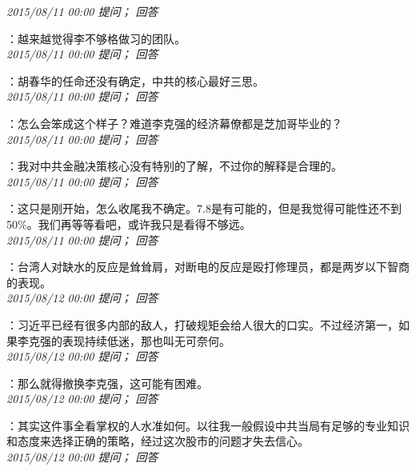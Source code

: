 \documentclass[twocolumn]{ctexart}
\begin{document}
\textit{\hfill\noindent\small 2015/08/11 00:00 提问； 回答}

：越来越觉得李不够格做习的团队。\\

\textit{\hfill\noindent\small 2015/08/11 00:00 提问； 回答}

：胡春华的任命还没有确定，中共的核心最好三思。\\

\textit{\hfill\noindent\small 2015/08/11 00:00 提问； 回答}

：怎么会笨成这个样子？难道李克强的经济幕僚都是芝加哥毕业的？\\

\textit{\hfill\noindent\small 2015/08/11 00:00 提问； 回答}

：我对中共金融决策核心没有特别的了解，不过你的解释是合理的。\\

\textit{\hfill\noindent\small 2015/08/11 00:00 提问； 回答}

：这只是刚开始，怎么收尾我不确定。7.8是有可能的，但是我觉得可能性还不到50\%。我们再等等看吧，或许我只是看得不够远。\\

\textit{\hfill\noindent\small 2015/08/11 00:00 提问； 回答}

：台湾人对缺水的反应是耸耸肩，对断电的反应是殴打修理员，都是两岁以下智商的表现。\\

\textit{\hfill\noindent\small 2015/08/12 00:00 提问； 回答}

：习近平已经有很多内部的敌人，打破规矩会给人很大的口实。不过经济第一，如果李克强的表现持续低迷，那也叫无可奈何。\\

\textit{\hfill\noindent\small 2015/08/12 00:00 提问； 回答}

：那么就得撤换李克强，这可能有困难。\\

\textit{\hfill\noindent\small 2015/08/12 00:00 提问； 回答}

：其实这件事全看掌权的人水准如何。以往我一般假设中共当局有足够的专业知识和态度来选择正确的策略，经过这次股市的问题才失去信心。\\

\textit{\hfill\noindent\small 2015/08/12 00:00 提问； 回答}
\end{document}
